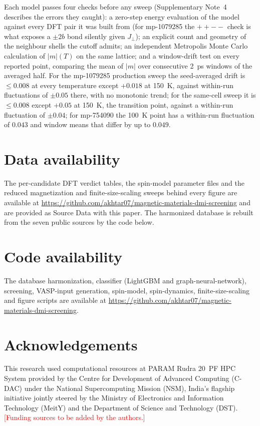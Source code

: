 \documentclass[aps,prb,preprint,superscriptaddress,longbibliography,nofootinbib]{revtex4-2}
\begin{document}
Each model passes four checks before any sweep (Supplementary Note~4 describes the errors they caught): a zero-step energy evaluation of the model against every DFT pair it was built
from (for mp-1079285 the $++--$ check is what exposes a $\pm2b$ bond silently given $J_\perp$); an explicit
count and geometry of the neighbour shells the cutoff admits; an independent Metropolis Monte Carlo
calculation of $|m|(T)$ on the same lattice; and a window-drift test on every reported point, comparing the
mean of $|m|$ over consecutive 2~ps windows of the averaged half. For the mp-1079285 production sweep the
seed-averaged drift is $\le0.008$ at every temperature except $+0.018$ at 150~K, against within-run
fluctuations of $\pm0.05$ there, with no monotonic trend; for the same-cell sweep it is $\le0.008$ except
$+0.05$ at 150~K, the transition point, against a within-run fluctuation of $\pm0.04$; for mp-754090 the 100~K point has a within-run fluctuation of $0.043$ and window
means that differ by up to $0.049$.

\section*{Data availability}

The per-candidate DFT verdict tables, the spin-model parameter files and the reduced magnetization and
finite-size-scaling sweeps behind every figure are available at
\url{https://github.com/akhtar07/magnetic-materials-dmi-screening} and are provided as Source Data with this
paper. The harmonized database is rebuilt from the seven public sources by the code below.

\section*{Code availability}

The database harmonization, classifier (LightGBM and graph-neural-network), screening, VASP-input generation, spin-model, spin-dynamics,
finite-size-scaling and figure scripts are available at
\url{https://github.com/akhtar07/magnetic-materials-dmi-screening}.

\section*{Acknowledgements}

This research used computational resources at PARAM Rudra 20~PF HPC System provided by the Centre for
Development of Advanced Computing (C-DAC) under the National Supercomputing Mission (NSM), India's flagship
initiative jointly steered by the Ministry of Electronics and Information Technology (MeitY) and the
Department of Science and Technology (DST). \textcolor{red}{[Funding sources to be added by the authors.]}
\end{document}
